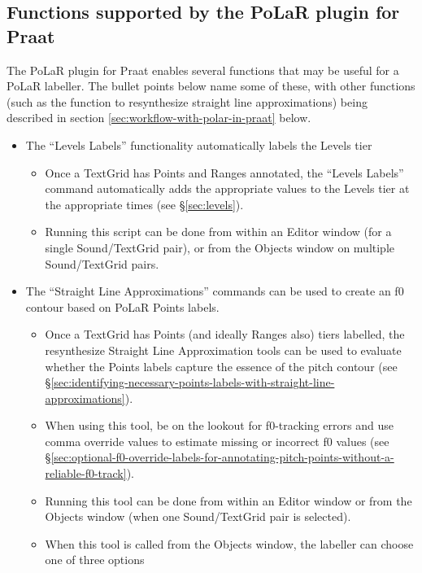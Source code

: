 \documentclass[11pt, twoside]{memoir}
\begin{document}
\subsection{Functions supported by the PoLaR plugin for Praat}
The PoLaR plugin for Praat enables several functions that may be useful for a PoLaR labeller. The bullet points below name some of these, with other functions (such as the function to resynthesize straight line approximations) being described in section \ref{sec:workflow-with-polar-in-praat} below.

\begin{itemize}
	\item The “Levels Labels” functionality automatically labels the Levels tier
	\begin{itemize}
		\item Once a TextGrid has Points and Ranges annotated, the “Levels Labels” command automatically adds the appropriate values to the Levels tier at the appropriate times (see §\ref{sec:levels}).
		\item Running this script can be done from within an Editor window (for a single Sound\slash TextGrid pair), or from the Objects window on multiple Sound\slash TextGrid pairs.
	\end{itemize}
	\item The “Straight Line Approximations” commands can be used to create an f0 contour based on PoLaR Points labels.
	\begin{itemize}
		\item Once a TextGrid has Points (and ideally Ranges also) tiers labelled, the resynthesize Straight Line Approximation tools can be used to evaluate whether the Points labels capture the essence of the pitch contour (see §\ref{sec:identifying-necessary-points-labels-with-straight-line-approximations}).
		\item When using this tool, be on the lookout for f0-tracking errors and use comma override values to estimate missing or incorrect f0 values (see §\ref{sec:optional-f0-override-labels-for-annotating-pitch-points-without-a-reliable-f0-track}). 
		\item Running this tool can be done from within an Editor window or from the Objects window (when one Sound\slash TextGrid pair is selected).
		\item When this tool is called from the Objects window, the labeller can choose one of three options

\end{itemize}
\end{itemize}
\end{document}
